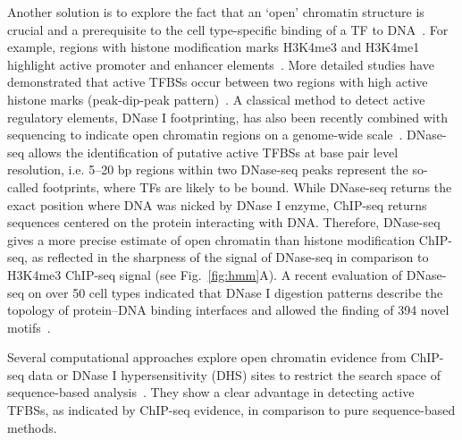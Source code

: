 \documentclass{bioinfo}
\begin{document}
Another solution is to explore the fact that an `open' chromatin structure
is crucial and a prerequisite to the cell type-specific binding of a TF to
DNA~\citep{arvey2012,thurman2012}. For example, regions with histone
modification marks H3K4me3 and H3K4me1 highlight active promoter and enhancer
{\color{red} elements}~\citep{bell2011}. More detailed studies have demonstrated that
active TFBSs occur between two regions with high active histone marks
(peak-dip-peak pattern)~\citep{hon2009}. A classical
method to detect active regulatory elements, DNase I footprinting, has
also been recently combined with sequencing to indicate open chromatin
regions on a genome-wide scale~\citep{crawford2006b}.
DNase-seq allows the identification of putative active TFBSs at
base pair level resolution, i.e. 5--20 bp regions within two DNase-seq
peaks represent the so-called footprints, where TFs are likely to be
bound. While DNase-seq returns the exact position where DNA was nicked by
DNase I enzyme, ChIP-seq returns sequences centered on the protein
interacting with DNA. Therefore, DNase-seq gives a more precise estimate
of open chromatin than histone modification ChIP-seq, as reflected in the
sharpness of the signal of DNase-seq in comparison to H3K4me3 ChIP-seq signal
(see Fig.~\ref{fig:hmm}A). A recent evaluation of DNase-seq on over 50 cell types
indicated that DNase I digestion patterns describe the topology of protein--DNA binding
interfaces and allowed the finding of 394 novel motifs~\citep{neph2012a}.

Several computational approaches explore open chromatin evidence from ChIP-seq
data or DNase I hypersensitivity (DHS) sites to restrict the search space of sequence-based
analysis~\citep{boyle2011,cuellar2012,gusmao2012,natarajan2012,neph2012a,pique2011,whitington2009,won2010}.
They show a clear advantage in detecting active TFBSs, as indicated by ChIP-seq
evidence, in comparison to pure sequence-based methods.
\end{document}

